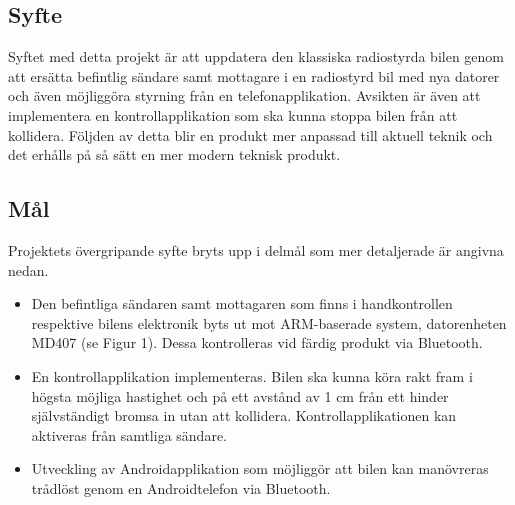 \documentclass[a4paper]{article}
\begin{document}
\subsection{Syfte}

Syftet med detta projekt är att uppdatera den klassiska radiostyrda bilen genom att ersätta befintlig sändare samt mottagare i en radiostyrd bil med nya datorer och även möjliggöra styrning från en telefonapplikation. Avsikten är även att implementera en kontrollapplikation som ska kunna stoppa bilen från att kollidera. Följden av detta blir en produkt mer anpassad till aktuell teknik och det erhålls på så sätt en mer modern teknisk produkt.


\subsection{Mål}
Projektets övergripande syfte bryts upp i delmål som mer detaljerade är angivna nedan.

\begin{itemize}
\item Den befintliga sändaren samt mottagaren som finns i handkontrollen respektive bilens elektronik byts ut mot ARM-baserade system, datorenheten MD407 (se Figur 1). Dessa kontrolleras vid färdig produkt via Bluetooth.
\item En kontrollapplikation implementeras. Bilen ska kunna köra rakt fram i högsta möjliga hastighet och på ett avstånd av 1 cm från ett hinder självständigt bromsa in utan att kollidera. Kontrollapplikationen kan aktiveras från samtliga sändare.
\item Utveckling av Androidapplikation som möjliggör att bilen kan manövreras trådlöst genom en Androidtelefon via Bluetooth.
\end{itemize}
\end{document}
